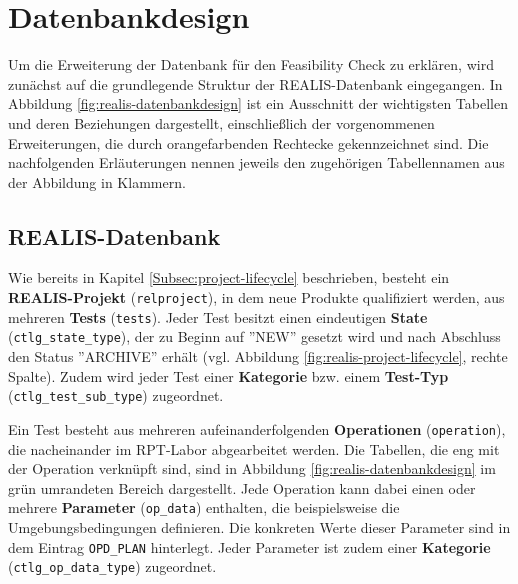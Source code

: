 \section{Datenbankdesign}
Um die Erweiterung der Datenbank für den Feasibility Check zu erklären, wird zunächst auf die grundlegende Struktur der REALIS-Datenbank eingegangen. In Abbildung \ref{fig:realis-datenbankdesign} ist ein Ausschnitt der wichtigsten Tabellen und deren Beziehungen dargestellt, einschließlich der vorgenommenen Erweiterungen, die durch orangefarbenden Rechtecke gekennzeichnet sind. Die nachfolgenden Erläuterungen nennen jeweils den zugehörigen Tabellennamen aus der Abbildung in Klammern.

\subsection{REALIS-Datenbank}

Wie bereits in Kapitel \ref{Subsec:project-lifecycle} beschrieben, besteht ein \textbf{REALIS-Projekt} (\texttt{relproject}), in dem neue Produkte qualifiziert werden, aus mehreren \textbf{Tests} (\texttt{tests}). Jeder Test besitzt einen eindeutigen \textbf{State} (\texttt{ctlg\_state\_type}), der zu Beginn auf ''NEW'' gesetzt wird und nach Abschluss den Status ''ARCHIVE'' erhält (vgl. Abbildung \ref{fig:realis-project-lifecycle}, rechte Spalte). Zudem wird jeder Test einer \textbf{Kategorie} bzw. einem \textbf{Test-Typ} (\texttt{ctlg\_test\-\_sub\_type}) zugeordnet.

Ein Test besteht aus mehreren aufeinanderfolgenden \textbf{Operationen} (\texttt{operation}), die nacheinander im \gls{RPT}-Labor abgearbeitet werden. Die Tabellen, die eng mit der Operation verknüpft sind, sind in Abbildung \ref{fig:realis-datenbankdesign} im grün umrandeten Bereich dargestellt. Jede Operation kann dabei einen oder mehrere \textbf{Parameter} (\texttt{op\_data}) enthalten, die beispielsweise die Umgebungsbedingungen definieren. Die konkreten Werte dieser Parameter sind in dem Eintrag \texttt{OPD\_PLAN} hinterlegt. Jeder Parameter ist zudem einer \textbf{Kategorie} (\texttt{ctlg\_op\_\-data\_type}) zugeordnet.  


